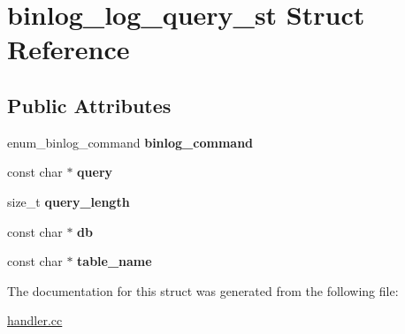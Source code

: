 \hypertarget{structbinlog__log__query__st}{}\section{binlog\+\_\+log\+\_\+query\+\_\+st Struct Reference}
\label{structbinlog__log__query__st}
\subsection*{Public Attributes}
\begin{DoxyCompactItemize}
\item 
\mbox{\label{structbinlog__log__query__st_a9e12e613206cc62998c2bd23489d8287}} 
enum\+\_\+binlog\+\_\+command {\bfseries binlog\+\_\+command}
\item 
\mbox{\label{structbinlog__log__query__st_a76ef554f426f837693acdc3dd833946b}} 
const char $\ast$ {\bfseries query}
\item 
\mbox{\label{structbinlog__log__query__st_afe94ec9a25deeb45ecd9cde71a5e4198}} 
size\+\_\+t {\bfseries query\+\_\+length}
\item 
\mbox{\label{structbinlog__log__query__st_a5ca6759753c545c9f6f92d446a64278d}} 
const char $\ast$ {\bfseries db}
\item 
\mbox{\label{structbinlog__log__query__st_a5da44566c5a59741939f81bed1d33912}} 
const char $\ast$ {\bfseries table\+\_\+name}
\end{DoxyCompactItemize}


The documentation for this struct was generated from the following file\+:\begin{DoxyCompactItemize}
\item 
\mbox{\hyperlink{handler_8cc}{handler.\+cc}}\end{DoxyCompactItemize}
